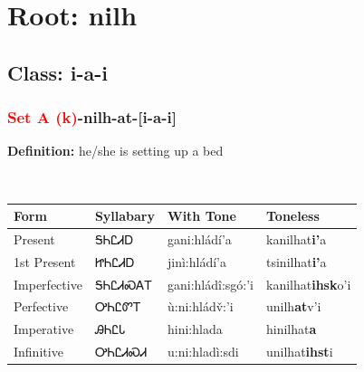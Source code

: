\needspace{4in}
\section*{Root: nilh}
\nopagebreak
{}
\needspace{3in}
\subsection*{Class: i-a-i}
\nopagebreak
\needspace{2in}
\subsubsection*{\textcolor{Red}{Set A (k)}{-}\textbf{nilh}{-}at{-}[i-a-i]}
\nopagebreak
\textbf{Definition: } he/she is setting up a bed
\\[0.5em]
\begin{tabularx}{\textwidth}{l X X X}%
\toprule%
\textbf{Form}&\textbf{Syllabary}&\textbf{With Tone}&\textbf{Toneless}\\%
\midrule%
Present&ᎦᏂᏝᏗᎠ&gani:hládí’a&kanilhat\textbf{i'}a\\%
1st Present&ᏥᏂᏝᏗᎠ&jinì:hládí’a&tsinilhat\textbf{i'}a\\%
Imperfective&ᎦᏂᏝᏗᏍᎪᎢ&gani:hládî:sgó:’i&kanilhat\textbf{ihsk}o'i\\%
Perfective&ᎤᏂᏝᏛᎢ&ù:ni:hládv̌:’i&unilh\textbf{at}v'i\\%
Imperative&ᎯᏂᏝᏓ&hini:hlada&hinilhat\textbf{a}\\%
Infinitive&ᎤᏂᏝᏗᏍᏗ&u:ni:hladì:sdi&unilhat\textbf{ihst}i\\%
\bottomrule%
\end{tabularx}
\\[1em]